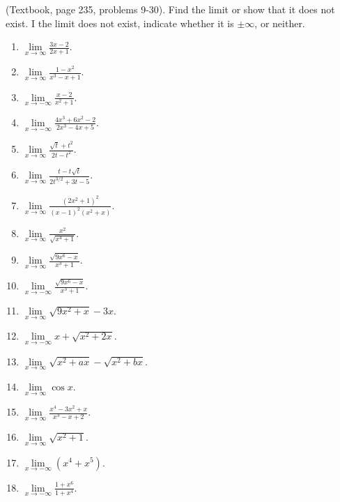 \begin{problem} (Textbook, page 235, problems 9-30).
Find the limit or show that it does not exist. I the limit does not exist, indicate whether it is $\pm\infty$, or neither. 
\begin{multicols}{3}
\begin{enumerate}
\item $\lim\limits_{x\to\infty }\frac{3x-2}{2x+1}$.
\item $\lim\limits_{x\to\infty }\frac{1-x^2}{x^3-x+1}$.
\item $\lim\limits_{x\to-\infty }\frac{x-2}{x^2+1}$.
\item $\lim\limits_{x\to-\infty }\frac{4x^3+6x^2-2}{2x^3-4x+5}$.
\item $\lim\limits_{x\to\infty }\frac{\sqrt{t}+t^2}{2t-t^2}$.
\item $\lim\limits_{x\to\infty }\frac{t-t\sqrt{t}}{2t^{3/2}+3t-5}$.
\item $\lim\limits_{x\to\infty }\frac{(2x^2+1)^2}{(x-1)^2(x^2+x)}$.
\item $\lim\limits_{x\to\infty }\frac{x^2}{\sqrt{x^4+1}}$.
\item $\lim\limits_{x\to\infty }\frac{\sqrt{9x^6-x}}{x^3+1}$.
\item $\lim\limits_{x\to-\infty }\frac{\sqrt{9x^6-x}}{x^3+1}$.
\item $\lim\limits_{x\to\infty}\sqrt{9x^2+x}-3x$.

\item $\lim\limits_{x\to-\infty}x+\sqrt{x^2+2x} $.

\item $\lim\limits_{x\to\infty}\sqrt{x^2+ax}-\sqrt{x^2+bx}$.

\item $\lim\limits_{x\to\infty}\cos x$.
\item $\lim\limits_{x\to\infty}\frac{x^4-3x^2+x}{x^3-x+2}$.

\answer{$\infty$}
\item $\lim\limits_{x\to\infty}\sqrt{x^2+1}$.

\answer{$\infty$}
\item $\lim\limits_{x\to-\infty}(x^4+x^5)$.

\answer{$-\infty$}
\item $\lim\limits_{x\to-\infty}\frac{1+x^6}{1+x^4}$.


\end{enumerate}
\end{multicols}
\end{problem}
